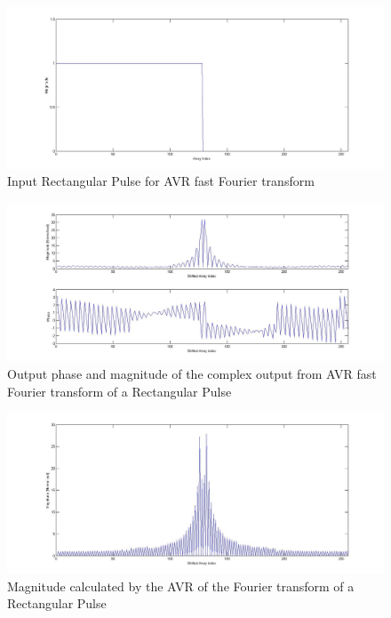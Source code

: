 \begin{figure}
\includegraphics[width=\textwidth]{./Figures/AVR_FFT_Square_Input.jpg}
\caption{Input Rectangular Pulse for AVR fast Fourier transform}
\label{fig:AVR:FFT:Square:Input}
\end{figure}
\begin{figure}
\includegraphics[width=\textwidth]{./Figures/AVR_FFT_Square_Complex_Output.jpg}
\caption{Output phase and magnitude of the complex output from AVR fast Fourier transform of a Rectangular Pulse}
\label{fig:AVR:FFT:Square:Output}
\end{figure}
\begin{figure}
\includegraphics[width=\textwidth]{./Figures/AVR_FFT_Square_Mag.jpg}
\caption{Magnitude calculated by the AVR of the Fourier transform of a Rectangular Pulse}
\label{fig:AVR:FFT:Square:Mag}
\end{figure}

